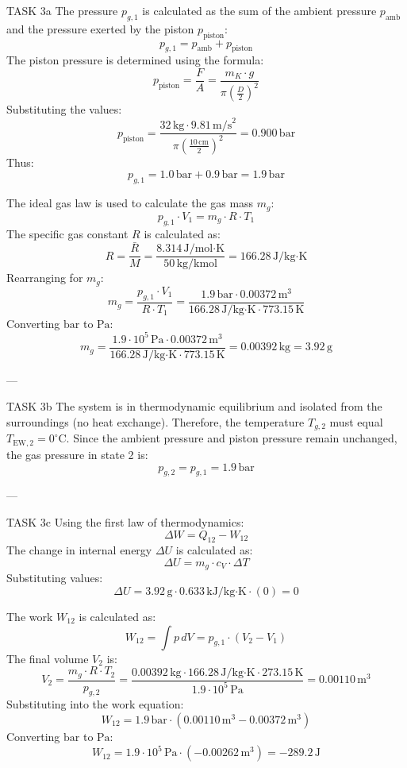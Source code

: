 TASK 3a  
The pressure \( p_{g,1} \) is calculated as the sum of the ambient pressure \( p_{\text{amb}} \) and the pressure exerted by the piston \( p_{\text{piston}} \):  
\[
p_{g,1} = p_{\text{amb}} + p_{\text{piston}}
\]  
The piston pressure is determined using the formula:  
\[
p_{\text{piston}} = \frac{F}{A} = \frac{m_K \cdot g}{\pi \left(\frac{D}{2}\right)^2}
\]  
Substituting the values:  
\[
p_{\text{piston}} = \frac{32 \, \text{kg} \cdot 9.81 \, \text{m/s}^2}{\pi \left(\frac{10 \, \text{cm}}{2}\right)^2} = 0.900 \, \text{bar}
\]  
Thus:  
\[
p_{g,1} = 1.0 \, \text{bar} + 0.9 \, \text{bar} = 1.9 \, \text{bar}
\]  

The ideal gas law is used to calculate the gas mass \( m_g \):  
\[
p_{g,1} \cdot V_1 = m_g \cdot R \cdot T_1
\]  
The specific gas constant \( R \) is calculated as:  
\[
R = \frac{\bar{R}}{M} = \frac{8.314 \, \text{J/mol·K}}{50 \, \text{kg/kmol}} = 166.28 \, \text{J/kg·K}
\]  
Rearranging for \( m_g \):  
\[
m_g = \frac{p_{g,1} \cdot V_1}{R \cdot T_1} = \frac{1.9 \, \text{bar} \cdot 0.00372 \, \text{m}^3}{166.28 \, \text{J/kg·K} \cdot 773.15 \, \text{K}}
\]  
Converting \( \text{bar} \) to \( \text{Pa} \):  
\[
m_g = \frac{1.9 \cdot 10^5 \, \text{Pa} \cdot 0.00372 \, \text{m}^3}{166.28 \, \text{J/kg·K} \cdot 773.15 \, \text{K}} = 0.00392 \, \text{kg} = 3.92 \, \text{g}
\]  

---

TASK 3b  
The system is in thermodynamic equilibrium and isolated from the surroundings (no heat exchange). Therefore, the temperature \( T_{g,2} \) must equal \( T_{\text{EW},2} = 0^\circ\text{C} \). Since the ambient pressure and piston pressure remain unchanged, the gas pressure in state 2 is:  
\[
p_{g,2} = p_{g,1} = 1.9 \, \text{bar}
\]  

---

TASK 3c  
Using the first law of thermodynamics:  
\[
\Delta W = Q_{12} - W_{12}
\]  
The change in internal energy \( \Delta U \) is calculated as:  
\[
\Delta U = m_g \cdot c_V \cdot \Delta T
\]  
Substituting values:  
\[
\Delta U = 3.92 \, \text{g} \cdot 0.633 \, \text{kJ/kg·K} \cdot (0) = 0
\]  

The work \( W_{12} \) is calculated as:  
\[
W_{12} = \int p \, dV = p_{g,1} \cdot (V_2 - V_1)
\]  
The final volume \( V_2 \) is:  
\[
V_2 = \frac{m_g \cdot R \cdot T_2}{p_{g,2}} = \frac{0.00392 \, \text{kg} \cdot 166.28 \, \text{J/kg·K} \cdot 273.15 \, \text{K}}{1.9 \cdot 10^5 \, \text{Pa}} = 0.00110 \, \text{m}^3
\]  
Substituting into the work equation:  
\[
W_{12} = 1.9 \, \text{bar} \cdot (0.00110 \, \text{m}^3 - 0.00372 \, \text{m}^3)
\]  
Converting \( \text{bar} \) to \( \text{Pa} \):  
\[
W_{12} = 1.9 \cdot 10^5 \, \text{Pa} \cdot (-0.00262 \, \text{m}^3) = -289.2 \, \text{J}
\]